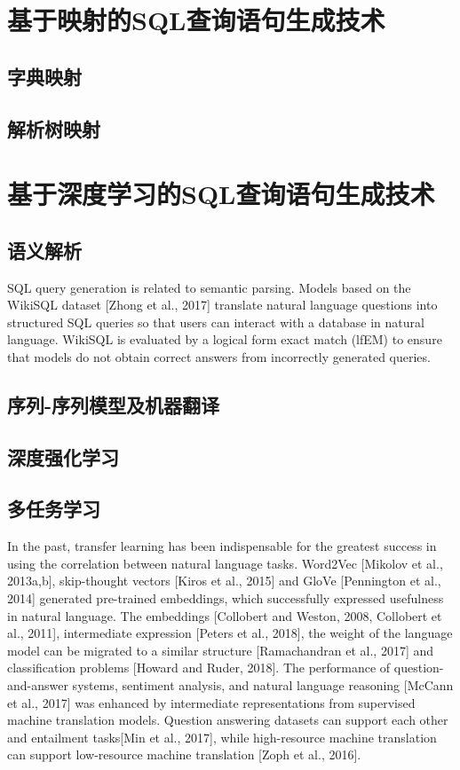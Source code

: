\section{基于映射的SQL查询语句生成技术}
\subsection{字典映射}
\subsection{解析树映射}
\section{基于深度学习的SQL查询语句生成技术}
\subsection{语义解析}
SQL query generation is related to semantic parsing. Models based on the
WikiSQL dataset [Zhong et al., 2017] translate natural language questions into structured SQL
queries so that users can interact with a database in natural language. WikiSQL is evaluated by a
logical form exact match (lfEM) to ensure that models do not obtain correct answers from incorrectly
generated queries.
\subsection{序列-序列模型及机器翻译}

\subsection{深度强化学习}

\subsection{多任务学习}
In the past, transfer learning has been indispensable for the greatest success in using the correlation between natural language tasks. Word2Vec [Mikolov et al., 2013a,b], skip-thought vectors [Kiros et al., 2015] and GloVe [Pennington et al., 2014] generated pre-trained embeddings, which successfully expressed usefulness in natural language. The embeddings [Collobert and Weston, 2008, Collobert et al., 2011], intermediate expression [Peters et al., 2018], the weight of the language model can be migrated to a similar structure [Ramachandran et al., 2017] and classification problems [Howard and Ruder, 2018]. The performance of question-and-answer systems, sentiment analysis, and natural language reasoning [McCann et al., 2017] was enhanced by intermediate representations from supervised machine translation models. Question answering datasets can support each other and entailment tasks[Min et al., 2017], while high-resource machine translation can support low-resource machine translation [Zoph et al., 2016].

